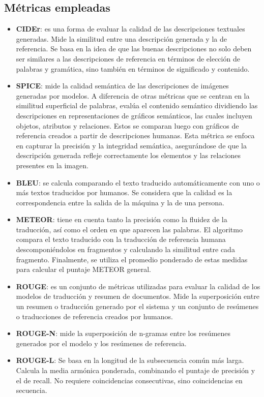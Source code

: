 \subsection*{Métricas empleadas}
\begin{itemize}
    \item \textbf{CIDEr}: es una forma de evaluar la calidad de las descripciones textuales generadas. Mide la similitud entre una descripción generada y la de referencia. Se basa en la idea de que las buenas descripciones no solo deben ser similares a las descripciones de referencia en términos de elección de palabras y gramática, sino también en términos de significado y contenido.
    
    \item \textbf{SPICE}: mide la calidad semántica de las descripciones de imágenes generadas por modelos. A diferencia de otras métricas que se centran en la similitud superficial de palabras, evalúa el contenido semántico dividiendo las descripciones en representaciones de gráficos semánticos, las cuales incluyen objetos, atributos y relaciones. Estos se comparan luego con gráficos de referencia creados a partir de descripciones humanas. Esta métrica se enfoca en capturar la precisión y la integridad semántica, asegurándose de que la descripción generada refleje correctamente los elementos y las relaciones presentes en la imagen.

    \item \textbf{BLEU}: se calcula comparando el texto traducido automáticamente con uno o más textos traducidos por humanos. Se considera que la calidad es la correspondencia entre la salida de la máquina y la de una persona.
    
    \item \textbf{METEOR}: tiene en cuenta tanto la precisión como la fluidez de la traducción, así como el orden en que aparecen las palabras. El algoritmo compara el texto traducido con la traducción de referencia humana descomponiéndolos en fragmentos y calculando la similitud entre cada fragmento. Finalmente, se utiliza el promedio ponderado de estas medidas para calcular el puntaje METEOR general.
    
    \item \textbf{ROUGE}: es un conjunto de métricas utilizadas para evaluar la calidad de los modelos de traducción y resumen de documentos. Mide la superposición entre un resumen o traducción generado por el sistema y un conjunto de resúmenes o traducciones de referencia creados por humanos.
    \item \textbf{ROUGE-N}: mide la superposición de n-gramas entre los resúmenes generados por el modelo y los resúmenes de referencia.
    \item \textbf{ROUGE-L}: Se basa en la longitud de la subsecuencia común más larga. Calcula la media armónica ponderada, combinando el puntaje de precisión y el de recall. No requiere coincidencias consecutivas, sino coincidencias en secuencia.
\end{itemize}

